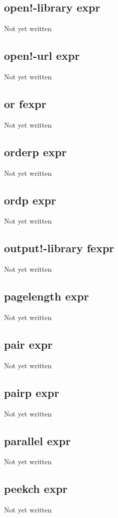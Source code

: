 \documentclass[a4paper,11pt]{article}
\begin{document}
{\subsection{\ttfamily open!-library expr}
   Not yet written

\subsection{\ttfamily open!-url expr}
   Not yet written

\subsection{\ttfamily or fexpr}
   Not yet written

\subsection{\ttfamily orderp expr}
   Not yet written

\subsection{\ttfamily ordp expr}
   Not yet written

\subsection{\ttfamily output!-library fexpr}
   Not yet written

\subsection{\ttfamily pagelength expr}
   Not yet written

\subsection{\ttfamily pair expr}
   Not yet written

\subsection{\ttfamily pairp expr}
   Not yet written

\subsection{\ttfamily parallel expr}
   Not yet written

\subsection{\ttfamily peekch expr}
   Not yet written

}
\end{document}
